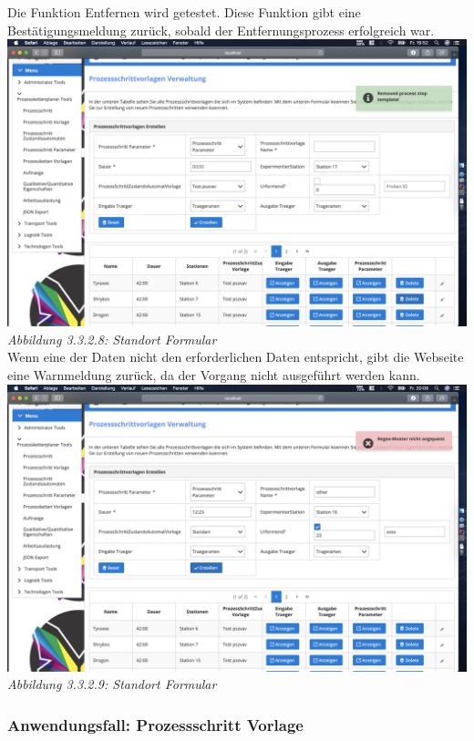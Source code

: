 \documentclass[enabledeprecatedfontcommands,fontsize=12pt,paper=a4,twoside]{scrartcl}
\begin{document}
Die Funktion Entfernen wird getestet. Diese Funktion gibt eine Bestätigungsmeldung zurück, sobald der Entfernungsprozess erfolgreich war.\\

\hypertarget{sc3.3.2.8}{
\includegraphics[width=1\textwidth]{Screenshots/332removePsv.png}\\
\textit{Abbildung 3.3.2.8: Standort Formular}
} \\

Wenn eine der Daten nicht den erforderlichen Daten entspricht, gibt die Webseite eine Warnmeldung zurück, da der Vorgang nicht ausgeführt werden kann.\\

\hypertarget{sc3.3.2.9}{
\includegraphics[width=1\textwidth]{Screenshots/332regexpsv.png}\\
\textit{Abbildung 3.3.2.9: Standort Formular}
} \\
\subsubsection{Anwendungsfall: Prozessschritt Vorlage}
\end{document}
